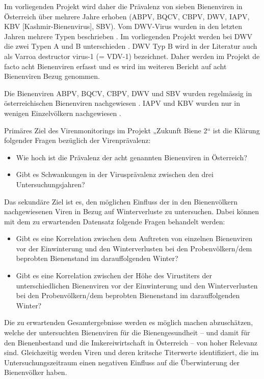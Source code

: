 Im vorliegenden Projekt wird daher die Prävalenz von sieben Bienenviren in Österreich über mehrere Jahre erhoben (ABPV, BQCV, CBPV, DWV, IAPV, KBV [Kashmir-Bienenvirus], SBV). Vom DWV-Virus wurden in den letzten Jahren mehrere Typen beschrieben \citep{martin2012,mordecai2016}. Im vorliegenden Projekt werden bei DWV die zwei Typen A und B unterschieden \citep{martin2012}. DWV Typ B wird in der Literatur auch als Varroa destructor virus-1 (= VDV-1) bezeichnet. Daher werden im Projekt de facto acht Bienenviren erfasst und es wird im weiteren Bericht auf acht Bienenviren Bezug genommen.

Die Bienenviren ABPV, BQCV, CBPV, DWV und SBV wurden regelmässig in österreichischen Bienenviren nachgewiesen \citep{berenyi2006,girsch2012,köglberger2009,morawetz2018}. IAPV und KBV wurden nur in wenigen Einzelvölkern nachgewiesen \citep{girsch2012}. 

Primäres Ziel des Virenmonitorings im Projekt „Zukunft Biene 2“ ist die Klärung folgender Fragen bezüglich der Virenprävalenz: 

\begin{itemize}
    \item Wie hoch ist die Prävalenz der acht genannten Bienenviren in Österreich? 
    \item Gibt es Schwankungen in der Virusprävalenz zwischen den drei Untersuchungsjahren?
\end{itemize}

Das sekundäre Ziel ist es, den möglichen Einfluss der in den Bienenvölkern nachgewiesenen Viren in Bezug auf Winterverluste zu untersuchen. Dabei können mit dem zu erwartenden Datensatz folgende Fragen behandelt werden: 

\begin{itemize}
    \item Gibt es eine Korrelation zwischen dem Auftreten von einzelnen Bienenviren vor der Einwinterung und den Winterverlusten bei den Probenvölkern/dem beprobten Bienenstand im darauffolgenden Winter? 
    \item Gibt es eine Korrelation zwischen der Höhe des Virustiters der unterschiedlichen Bienenviren vor der Einwinterung und den Winterverlusten bei den Probenvölkern/dem beprobten Bienenstand im darauffolgenden Winter?
\end{itemize}

Die zu erwartenden Gesamtergebnisse werden es möglich machen abzuschätzen, welche der untersuchten Bienenviren für die Bienengesundheit – und damit für den Bienenbestand und die Imkereiwirtschaft in Österreich – von hoher Relevanz sind. Gleichzeitig werden Viren und deren kritsche Titerwerte identifiziert, die im Untersuchungszeitraum einen negativen Einfluss auf die Überwinterung der Bienenvölker haben.
